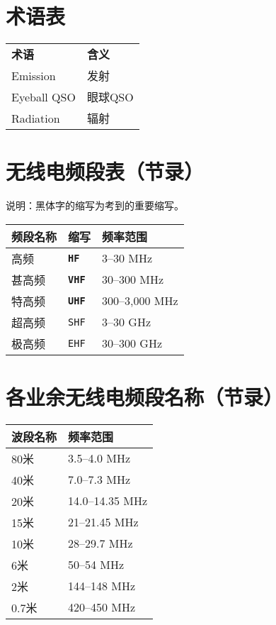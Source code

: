 \section{术语表}

\begin{longtable}[l]{ll}
	\textbf{术语} & \textbf{含义} \\
	Emission & 发射 \\
	Eyeball QSO & 眼球QSO \\
	Radiation & 辐射 \\
\end{longtable}

\newpage

\section{无线电频段表（节录）}

说明：黑体字的缩写为考到的重要缩写。

\begin{longtable}{|l|l|l|}
	\hline
	\textbf{频段名称} & \textbf{缩写} & \textbf{频率范围} \\
	\hline
	高频 & \texttt{\textbf{HF}} & 3–30 \unit{\MHz} \\
	\hline
	甚高频 & \texttt{\textbf{VHF}} & 30–300 \unit{\MHz} \\
	\hline
	特高频 & \texttt{\textbf{UHF}} & 300–3,000 \unit{\MHz} \\
	\hline
	超高频 & \texttt{SHF} & 3–30 \unit{\GHz} \\
	\hline
	极高频 & \texttt{EHF} & 30–300 \unit{\GHz} \\
	\hline
\end{longtable}

\newpage






\section{各业余无线电频段名称（节录）}


\begin{longtable}{|l|l|}
	\hline
	\textbf{波段名称} & \textbf{频率范围} \\
	\hline
	80米 & 3.5–4.0 \unit{\MHz} \\
	\hline
	40米 & 7.0–7.3 \unit{\MHz} \\
	\hline
	20米 & 14.0–14.35 \unit{\MHz} \\
	\hline
	15米 & 21–21.45 \unit{\MHz} \\
	\hline
	10米 & 28–29.7 \unit{\MHz} \\
	\hline
	6米 & 50–54 \unit{\MHz} \\
	\hline
	2米 & 144–148 \unit{\MHz} \\
	\hline
	0.7米 & 420–450 \unit{\MHz} \\
	\hline
\end{longtable}

